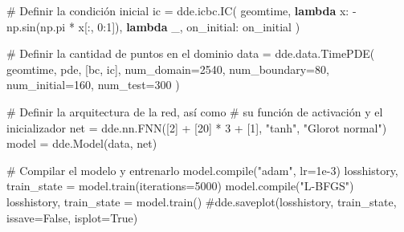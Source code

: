 \documentclass[
  spanish,
  us-letterpaper,
]{scrreprt}
\newenvironment{Shaded}{\begin{snugshade}}{\end{snugshade}}
\newcommand{\BuiltInTok}[1]{\textcolor[rgb]{0.00,0.23,0.31}{#1}}
\newcommand{\CommentTok}[1]{\textcolor[rgb]{0.37,0.37,0.37}{#1}}
\newcommand{\DecValTok}[1]{\textcolor[rgb]{0.68,0.00,0.00}{#1}}
\newcommand{\FloatTok}[1]{\textcolor[rgb]{0.68,0.00,0.00}{#1}}
\newcommand{\KeywordTok}[1]{\textcolor[rgb]{0.00,0.23,0.31}{\textbf{#1}}}
\newcommand{\NormalTok}[1]{\textcolor[rgb]{0.00,0.23,0.31}{#1}}
\newcommand{\OperatorTok}[1]{\textcolor[rgb]{0.37,0.37,0.37}{#1}}
\newcommand{\StringTok}[1]{\textcolor[rgb]{0.13,0.47,0.30}{#1}}
\theoremstyle{plain}
\theoremstyle{definition}
\theoremstyle{remark}
\begin{document}
\begin{Shaded}
\begin{Highlighting}[]
\CommentTok{\# Definir la condición inicial}
\NormalTok{ic }\OperatorTok{=}\NormalTok{ dde.icbc.IC(}
\NormalTok{    geomtime,}
    \KeywordTok{lambda}\NormalTok{ x: }\OperatorTok{{-}}\NormalTok{np.sin(np.pi }\OperatorTok{*}\NormalTok{ x[:, }\DecValTok{0}\NormalTok{:}\DecValTok{1}\NormalTok{]),}
    \KeywordTok{lambda}\NormalTok{ \_, on\_initial: on\_initial}
\NormalTok{)}

\CommentTok{\# Definir la cantidad de puntos en el dominio}
\NormalTok{data }\OperatorTok{=}\NormalTok{ dde.data.TimePDE(}
\NormalTok{    geomtime, pde, [bc, ic],}
\NormalTok{    num\_domain}\OperatorTok{=}\DecValTok{2540}\NormalTok{,}
\NormalTok{    num\_boundary}\OperatorTok{=}\DecValTok{80}\NormalTok{,}
\NormalTok{    num\_initial}\OperatorTok{=}\DecValTok{160}\NormalTok{,}
\NormalTok{    num\_test}\OperatorTok{=}\DecValTok{300}
\NormalTok{)}

\CommentTok{\# Definir la arquitectura de la red, así como}
\CommentTok{\# su función de activación y el inicializador}
\NormalTok{net }\OperatorTok{=}\NormalTok{ dde.nn.FNN([}\DecValTok{2}\NormalTok{] }\OperatorTok{+}\NormalTok{ [}\DecValTok{20}\NormalTok{] }\OperatorTok{*} \DecValTok{3} \OperatorTok{+}\NormalTok{ [}\DecValTok{1}\NormalTok{], }\StringTok{"tanh"}\NormalTok{, }\StringTok{"Glorot normal"}\NormalTok{)}
\NormalTok{model }\OperatorTok{=}\NormalTok{ dde.Model(data, net)}

\CommentTok{\# Compilar el modelo y entrenarlo}
\NormalTok{model.}\BuiltInTok{compile}\NormalTok{(}\StringTok{"adam"}\NormalTok{, lr}\OperatorTok{=}\FloatTok{1e{-}3}\NormalTok{)}
\NormalTok{losshistory, train\_state }\OperatorTok{=}\NormalTok{ model.train(iterations}\OperatorTok{=}\DecValTok{5000}\NormalTok{)}
\NormalTok{model.}\BuiltInTok{compile}\NormalTok{(}\StringTok{"L{-}BFGS"}\NormalTok{)}
\NormalTok{losshistory, train\_state }\OperatorTok{=}\NormalTok{ model.train()}
\CommentTok{\#dde.saveplot(losshistory, train\_state, issave=False, isplot=True)}
\end{Highlighting}
\end{Shaded}
\end{document}
